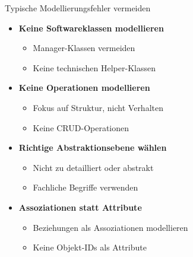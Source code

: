 \begin{theorem}{Typische Modellierungsfehler vermeiden}
\begin{itemize}
    \item \textbf{Keine Softwareklassen modellieren}
    \begin{itemize}
        \item Manager-Klassen vermeiden
        \item Keine technischen Helper-Klassen
    \end{itemize}
    
    \item \textbf{Keine Operationen modellieren}
    \begin{itemize}
        \item Fokus auf Struktur, nicht Verhalten
        \item Keine CRUD-Operationen
    \end{itemize}
    
    \item \textbf{Richtige Abstraktionsebene wählen}
    \begin{itemize}
        \item Nicht zu detailliert oder abstrakt
        \item Fachliche Begriffe verwenden
    \end{itemize}
    
    \item \textbf{Assoziationen statt Attribute}
    \begin{itemize}
        \item Beziehungen als Assoziationen modellieren
        \item Keine Objekt-IDs als Attribute
    \end{itemize}
\end{itemize}
\end{theorem}


